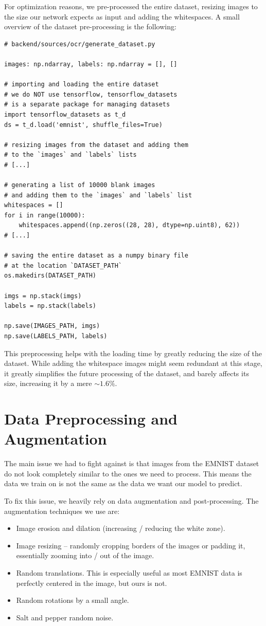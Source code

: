 \documentclass[11pt, a4paper]{report}
\begin{document}
For optimization reasons, we pre-processed the entire dataset, resizing images to the size our network expects as input and adding the whitespaces. A small overview of the dataset pre-processing is the following:


\begin{verbatim}
# backend/sources/ocr/generate_dataset.py

images: np.ndarray, labels: np.ndarray = [], []

# importing and loading the entire dataset
# we do NOT use tensorflow, tensorflow_datasets
# is a separate package for managing datasets
import tensorflow_datasets as t_d
ds = t_d.load('emnist', shuffle_files=True)

# resizing images from the dataset and adding them
# to the `images` and `labels` lists
# [...]

# generating a list of 10000 blank images
# and adding them to the `images` and `labels` list
whitespaces = []
for i in range(10000):
    whitespaces.append((np.zeros((28, 28), dtype=np.uint8), 62))
# [...]

# saving the entire dataset as a numpy binary file
# at the location `DATASET_PATH`
os.makedirs(DATASET_PATH)

imgs = np.stack(imgs)
labels = np.stack(labels)

np.save(IMAGES_PATH, imgs)
np.save(LABELS_PATH, labels)
\end{verbatim}

This preprocessing helps with the loading time by greatly reducing the size of the dataset. While adding the whitespace images might seem redundant at this stage, it greatly simplifies the future processing of the dataset, and barely affects its size, increasing it by a mere $\sim1.6\%$.

\section{Data Preprocessing and Augmentation}

The main issue we had to fight against is that images from the EMNIST dataset do not look completely similar to the ones we need to process. This means the data we train on is not the same as the data we want our model to predict.

To fix this issue, we heavily rely on data augmentation and post-processing. The augmentation techniques we use are:
\begin{itemize}
	\item Image erosion and dilation (increasing / reducing the white zone).
	\item Image resizing -- randomly cropping borders of the images or padding it, essentially zooming into / out of the image.
	\item Random translations. This is especially useful as most EMNIST data is perfectly centered in the image, but ours is not.
	\item Random rotations by a small angle.
	\item Salt and pepper random noise.
\end{itemize}
\end{document}
